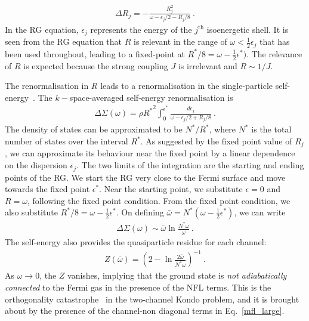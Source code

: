 \documentclass{iopart}
\begin{document}
\begin{eqnarray}
	\Delta R_j =- \frac{R_j^2}{\omega - \epsilon_{j}/2 - R_j/8}~.
\end{eqnarray}
In the RG equation, \(\epsilon_{j}\) represents the energy of the \(j^\mathrm{th}\) isoenergetic shell. It is seen from 
the RG equation that \(R\) is relevant in the range of \(\omega < \frac{1}{2}\epsilon_j\) that has been used throughout, leading to a fixed-point at \(R^*/8 = \omega - \frac{1}{2}\epsilon^*)\). The relevance of \(R\) is expected because the strong coupling \(J\) is irrelevant and \(R \sim 1/J\).

The renormalisation in \(R\) leads to a renormalisation in the single-particle self-energy~\cite{anirbanmott1}. The \(k-\)space-averaged self-energy renormalisation is
\begin{eqnarray}
	\Delta \Sigma(\omega) = \rho {R^*}^2\int_0^{\epsilon^*} \frac{d\epsilon_j}{\omega - \epsilon_j/2 + R_j/8}~.
\end{eqnarray}
The density of states can be approximated to be \(N^*/R^*\), where \(N^*\) is the total number of states over the interval \(R^*\). As suggested by the fixed point value of \(R_j\), we can approximate its behaviour near the fixed point by a linear dependence on the dispersion \(\epsilon_j\). The two limits of the integration are the starting and ending points of the RG. We start the RG very close to the Fermi surface and move towards the fixed point \(\epsilon^*\). Near the starting point, we substitute \(\epsilon = 0\) and \(R = \omega\), following the fixed point condition. From the fixed point condition, we also substitute \(R^*/8 = \omega - \frac{1}{2}\epsilon^*\). On defining \(\bar \omega = N^* \left(\omega - \frac{1}{2}\epsilon^*\right)\), we can write
\begin{eqnarray}
	\label{self_energy}
	\Delta \Sigma(\omega) \sim  \bar \omega \ln \frac{N^* \omega}{\bar \omega}~.
\end{eqnarray}
The self-energy also provides the quasiparticle residue for each channel\cite{anirbanmott1}:
\begin{eqnarray}
	Z(\bar\omega) = \left(2 - \ln \frac{2\bar\omega}{N^* \omega}\right) ^{-1}~.
\end{eqnarray}
As \(\omega \to 0\), the \(Z\) vanishes, implying that the ground state is {\it not adiabatically connected} to the Fermi gas in the presence of the NFL terms.
This is the orthogonality catastrophe~\cite{varma2002singular,anderson_infraredcat,yamada_catastrophe,yamada1979orthogonality} in the two-channel Kondo problem, and it is brought about by the presence of the channel-non diagonal terms in Eq.~\ref{mfl_large}.
\end{document}
